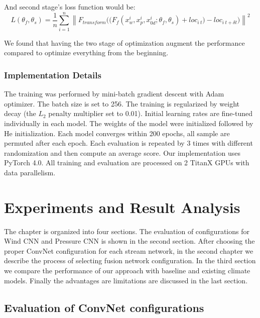 \begin{enumerate}[leftmargin=2em]
	And second stage's loss function would be:
	\begin{equation}
	\label{eq_fusion_2}
	L(\theta_{f}, \theta_{s}) = \frac{1}{n}\sum_{i=1}^{n} \left \| {F_{transform}((F_{f}(x_w^i, x_p^i, x_{0d}^i; \theta_{f}, \theta_{s})} + loc_{i\ t} ) - loc_{i\ t+\delta t} ) \right \| ^2
	\end{equation}
	
	 We found that having the two stage of optimization augment the performance compared to optimize everything from the beginning. 
	
	
	
\end{enumerate}



\subsection{Implementation Details}

The training was performed by mini-batch gradient descent with Adam optimizer. The batch size is set to 256. The training is regularized by weight decay (the $L_2$ penalty multiplier set to 0.01). Initial learning rates are fine-tuned individually in each model. The weights of the model were initialized followed by He initialization\cite{he2015delving}. Each model converges within 200 epochs, all sample are permuted after each epoch. Each evaluation is repeated by 3 times with different randomization and then compute an average score. Our implementation uses PyTorch 4.0. All training and evaluation are processed on 2 TitanX GPUs with data parallelism\cite{KRIZHEVSKY2014}. 


\chapter{Experiments and Result Analysis}
The chapter is organized into four sections. The evaluation of configurations for Wind CNN and Pressure CNN is shown in the second section. After choosing the proper ConvNet configuration for each stream network, in the second chapter we describe the process of selecting fusion network configuration. In the third section we compare the performance of our approach with baseline and existing climate models. Finally the advantages are limitations are discussed in the last section.  

\section{Evaluation of ConvNet configurations}

